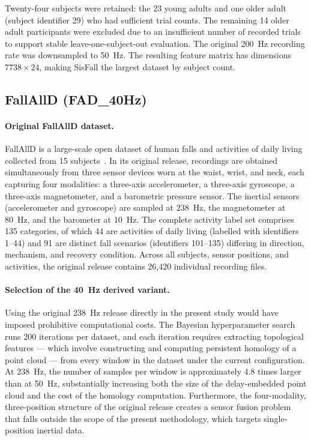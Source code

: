 Twenty-four subjects were retained: the 23 young adults and one older adult (subject identifier 29) who had sufficient trial counts. The remaining 14 older adult participants were excluded due to an insufficient number of recorded trials to support stable leave-one-subject-out evaluation. The original 200~Hz recording rate was downsampled to 50~Hz. The resulting feature matrix has dimensions $7738 \times 24$, making SisFall the largest dataset by subject count.

\subsection{FallAllD (FAD\_40Hz)}
\label{subsubsec:fallalld}

\paragraph{Original FallAllD dataset.}
FallAllD is a large-scale open dataset of human falls and activities of daily living collected from 15 subjects~\parencite{fallalld}. In its original release, recordings are obtained simultaneously from three sensor devices worn at the waist, wrist, and neck, each capturing four modalities: a three-axis accelerometer, a three-axis gyroscope, a three-axis magnetometer, and a barometric pressure sensor. The inertial sensors (accelerometer and gyroscope) are sampled at 238~Hz, the magnetometer at 80~Hz, and the barometer at 10~Hz. The complete activity label set comprises 135 categories, of which 44 are activities of daily living (labelled with identifiers 1--44) and 91 are distinct fall scenarios (identifiers 101--135) differing in direction, mechanism, and recovery condition. Across all subjects, sensor positions, and activities, the original release contains 26{,}420 individual recording files.

\paragraph{Selection of the 40~Hz derived variant.}
Using the original 238~Hz release directly in the present study would have imposed prohibitive computational costs. The Bayesian hyperparameter search runs 200 iterations per dataset, and each iteration requires extracting topological features --- which involve constructing and computing persistent homology of a point cloud --- from every window in the dataset under the current configuration. At 238~Hz, the number of samples per window is approximately 4.8 times larger than at 50~Hz, substantially increasing both the size of the delay-embedded point cloud and the cost of the homology computation. Furthermore, the four-modality, three-position structure of the original release creates a sensor fusion problem that falls outside the scope of the present methodology, which targets single-position inertial data.


